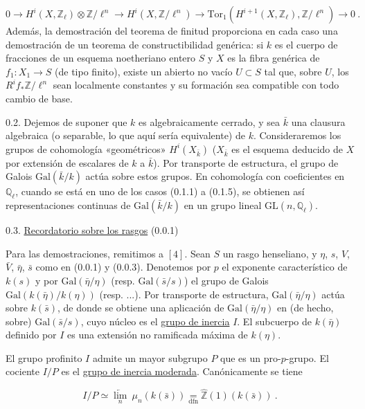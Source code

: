 \begin{equation*}
0 \longrightarrow H^i(X,\mathbb{Z}_\ell) \otimes \mathbb{Z}/\ell^n \longrightarrow H^i(X,\mathbb{Z}/\ell^n) \longrightarrow \mathrm{Tor}_1(H^{i+1}(X,\mathbb{Z}_\ell),\mathbb{Z}/\ell^n) \longrightarrow 0 \ .
\end{equation*}
Además, la demostración del teorema de finitud proporciona en cada caso una demostración de un teorema de constructibilidad genérica: si $k$ es el cuerpo de fracciones de un esquema noetheriano entero $S$ y $X$ es la fibra genérica de $f_1 : X_1 \longrightarrow S$ (de tipo finito), existe un abierto no vacío $U \subset S$ tal que, sobre $U$, los $R^i f_* \mathbb{Z}/\ell^n$ sean localmente constantes y su formación sea compatible con todo cambio de base.

0.2. Dejemos de suponer que $k$ es algebraicamente cerrado, y sea $\bar{k}$ una clausura algebraica (o separable, lo que aquí sería equivalente) de $k$. Consideraremos los grupos de cohomología «geométricos» $H^i(X_{\bar{k}})$ ($X_{\bar{k}}$ es el esquema deducido de $X$ por extensión de escalares de $k$ a $\bar{k}$). Por transporte de estructura, el grupo de Galois $\mathrm{Gal}(\bar{k}/k)$ actúa sobre estos grupos. En cohomología con coeficientes en $\mathbb{Q}_\ell$, cuando se está en uno de los casos (0.1.1) a (0.1.5), se obtienen así representaciones continuas de $\mathrm{Gal}(\bar{k}/k)$ en un grupo lineal $\mathrm{GL}(n,\mathbb{Q}_\ell)$.


0.3. \underline{Recordatorio sobre los rasgos} (0.0.1)

Para las demostraciones, remitimos a $[4]$. Sean $S$ un rasgo henseliano, y $\eta$, $s$, $V$, $\bar{V}$, $\bar{\eta}$, $\bar{s}$ como en (0.0.1) y (0.0.3). Denotemos por $p$ el exponente característico de $k(s)$ y por $\mathrm{Gal}(\bar{\eta}/\eta)$ (resp. $\mathrm{Gal}(\bar{s}/s)$) el grupo de Galois $\mathrm{Gal}(k(\bar{\eta})/k(\eta))$ (resp. ...). Por transporte de estructura, $\mathrm{Gal}(\bar{\eta}/\eta)$ actúa sobre $k(\bar{s})$, de donde se obtiene una aplicación de $\mathrm{Gal}(\bar{\eta}/\eta)$ en (de hecho, sobre) $\mathrm{Gal}(\bar{s}/s)$, cuyo núcleo es el \underline{grupo de inercia} $I$. El subcuerpo de $k(\bar{\eta})$ definido por $I$ es una extensión no ramificada máxima de $k(\eta)$.

El grupo profinito $I$ admite un mayor subgrupo $P$ que es un pro-$p$-grupo. El cociente $I/P$ es el \underline{grupo de inercia moderada}. Canónicamente se tiene

\begin{equation*}
I/P \simeq \underset{n}{\underleftarrow{\lim}}\ \mu_n(k(\bar{s})) \underset{\mathrm{dfn}}{=} \widehat{\mathbb{Z}}(1)(k(\bar{s})) \ .
\end{equation*}

